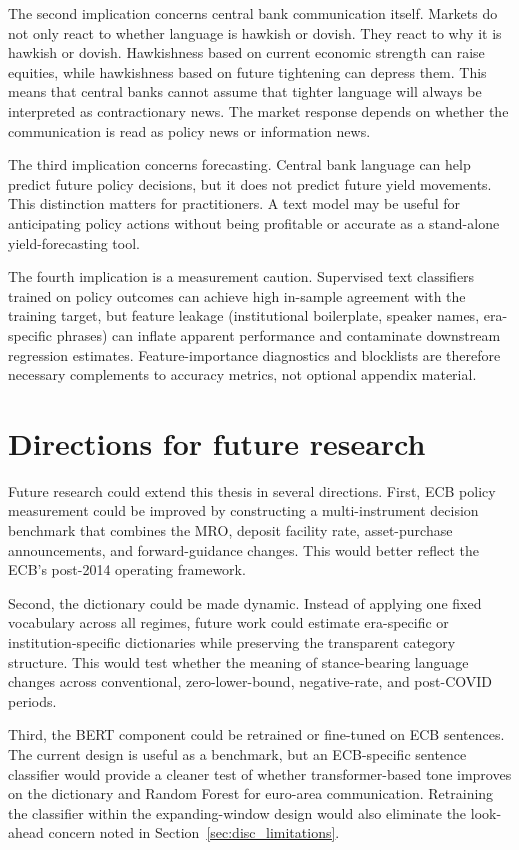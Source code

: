 The second implication concerns central bank communication itself. Markets do
not only react to whether language is hawkish or dovish. They react to why it is
hawkish or dovish. Hawkishness based on current economic strength can raise
equities, while hawkishness based on future tightening can depress them. This
means that central banks cannot assume that tighter language will always be
interpreted as contractionary news. The market response depends on whether the
communication is read as policy news or information news.

The third implication concerns forecasting. Central bank language can help
predict future policy decisions, but it does not predict future yield movements.
This distinction matters for practitioners. A text model may be useful for
anticipating policy actions without being profitable or accurate as a
stand-alone yield-forecasting tool.

The fourth implication is a measurement caution. Supervised text classifiers
trained on policy outcomes can achieve high in-sample agreement with the
training target, but feature leakage (institutional boilerplate, speaker names,
era-specific phrases) can inflate apparent performance and contaminate
downstream regression estimates. Feature-importance diagnostics and blocklists
are therefore necessary complements to accuracy metrics, not optional
appendix material.

\section{Directions for future research}
\label{sec:disc_future_research}

Future research could extend this thesis in several directions. First, ECB
policy measurement could be improved by constructing a multi-instrument
decision benchmark that combines the MRO, deposit facility rate, asset-purchase
announcements, and forward-guidance changes. This would better reflect the ECB's
post-2014 operating framework.

Second, the dictionary could be made dynamic. Instead of applying one fixed
vocabulary across all regimes, future work could estimate era-specific or
institution-specific dictionaries while preserving the transparent category
structure. This would test whether the meaning of stance-bearing language
changes across conventional, zero-lower-bound, negative-rate, and post-COVID
periods.

Third, the BERT component could be retrained or fine-tuned on ECB
sentences. The current design is useful as a benchmark, but an ECB-specific
sentence classifier would provide a cleaner test of whether transformer-based
tone improves on the dictionary and Random Forest for euro-area communication.
Retraining the classifier within the expanding-window design would also
eliminate the look-ahead concern noted in Section~\ref{sec:disc_limitations}.

